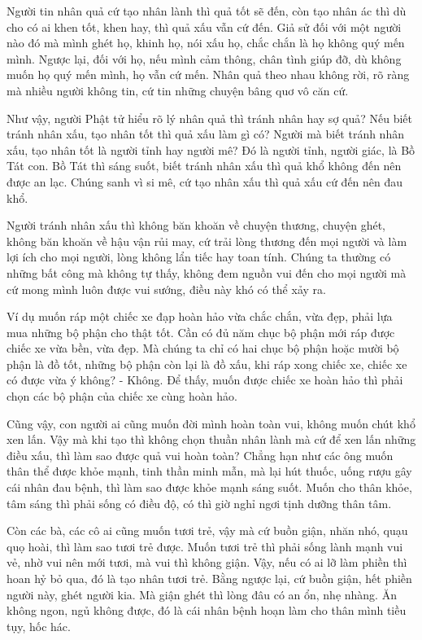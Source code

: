 \documentclass[
  12pt,
  oneside]{book}
\begin{document}
Người tin nhân quả cứ tạo nhân lành thì quả tốt sẽ đến, còn tạo nhân ác thì dù cho có ai khen tốt, khen hay, thì quả xấu vẫn cứ đến. Giả sử đối với một người nào đó mà mình ghét họ, khinh họ, nói xấu họ, chắc chắn là họ không quý mến mình. Ngược lại, đối với họ, nếu mình cảm thông, chân tình giúp đỡ, dù không muốn họ quý mến mình, họ vẫn cứ mến. Nhân quả theo nhau không rời, rõ ràng mà nhiều người không tin, cứ tin những chuyện bâng quơ vô căn cứ.

Như vậy, người Phật tử hiểu rõ lý nhân quả thì tránh nhân hay sợ quả? Nếu biết tránh nhân xấu, tạo nhân tốt thì quả xấu làm gì có? Người mà biết tránh nhân xấu, tạo nhân tốt là người tỉnh hay người mê? Đó là người tỉnh, người giác, là Bồ Tát con. Bồ Tát thì sáng suốt, biết tránh nhân xấu thì quả khổ không đến nên được an lạc. Chúng sanh vì si mê, cứ tạo nhân xấu thì quả xấu cứ đến nên đau khổ.

Người tránh nhân xấu thì không băn khoăn về chuyện thương, chuyện ghét, không băn khoăn về hậu vận rủi may, cứ trải lòng thương đến mọi người và làm lợi ích cho mọi người, lòng không lẩn tiếc hay toan tính. Chúng ta thường có những bất công mà không tự thấy, không đem nguồn vui đến cho mọi người mà cứ mong mình luôn được vui sướng, điều này khó có thể xảy ra.

Ví dụ muốn ráp một chiếc xe đạp hoàn hảo vừa chắc chắn, vừa đẹp, phải lựa mua những bộ phận cho thật tốt. Cần có đủ năm chục bộ phận mới ráp được chiếc xe vừa bền, vừa đẹp. Mà chúng ta chỉ có hai chục bộ phận hoặc mười bộ phận là đồ tốt, những bộ phận còn lại là đồ xấu, khi ráp xong chiếc xe, chiếc xe có được vừa ý không? - Không. Để thấy, muốn được chiếc xe hoàn hảo thì phải chọn các bộ phận của chiếc xe cùng hoàn hảo.

Cũng vậy, con người ai cũng muốn đời mình hoàn toàn vui, không muốn chút khổ xen lấn. Vậy mà khi tạo thì không chọn thuần nhân lành mà cứ để xen lấn những điều xấu, thì làm sao được quả vui hoàn toàn? Chẳng hạn như các ông muốn thân thể được khỏe mạnh, tinh thần minh mẫn, mà lại hút thuốc, uống rượu gây cái nhân đau bệnh, thì làm sao được khỏe mạnh sáng suốt. Muốn cho thân khỏe, tâm sáng thì phải sống có điều độ, có thì giờ nghỉ ngơi tịnh dưỡng thân tâm.

Còn các bà, các cô ai cũng muốn tươi trẻ, vậy mà cứ buồn giận, nhăn nhó, quạu quọ hoài, thì làm sao tươi trẻ được. Muốn tươi trẻ thì phải sống lành mạnh vui vẻ, nhờ vui nên mới tươi, mà vui thì không giận. Vậy, nếu có ai lỡ làm phiền thì hoan hỷ bỏ qua, đó là tạo nhân tươi trẻ. Bằng ngược lại, cứ buồn giận, hết phiền người này, ghét người kia. Mà giận ghét thì lòng đâu có an ổn, nhẹ nhàng. Ăn không ngon, ngủ không được, đó là cái nhân bệnh hoạn làm cho thân mình tiều tụy, hốc hác.
\end{document}
